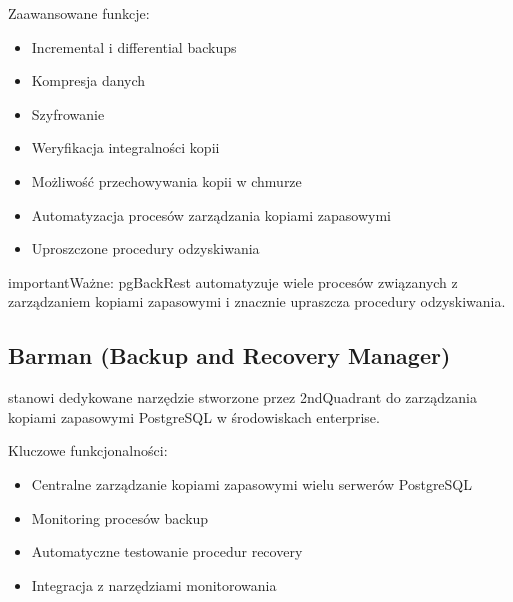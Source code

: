 \documentclass[letterpaper,10pt,polish]{sphinxmanual}
\begin{document}
\sphinxAtStartPar
Zaawansowane funkcje:
\begin{itemize}
\item {} 
\sphinxAtStartPar
Incremental i differential backups

\item {} 
\sphinxAtStartPar
Kompresja danych

\item {} 
\sphinxAtStartPar
Szyfrowanie

\item {} 
\sphinxAtStartPar
Weryfikacja integralności kopii

\item {} 
\sphinxAtStartPar
Możliwość przechowywania kopii w chmurze

\item {} 
\sphinxAtStartPar
Automatyzacja procesów zarządzania kopiami zapasowymi

\item {} 
\sphinxAtStartPar
Uproszczone procedury odzyskiwania

\end{itemize}

\begin{sphinxadmonition}{important}{Ważne:}
\sphinxAtStartPar
pgBackRest automatyzuje wiele procesów związanych z zarządzaniem kopiami zapasowymi i znacznie upraszcza procedury odzyskiwania.
\end{sphinxadmonition}


\subsection{Barman (Backup and Recovery Manager)}
\label{\detokenize{kopie_zapasowe_i_odzyskiwanie_danych:barman-backup-and-recovery-manager}}
\sphinxAtStartPar
{} stanowi dedykowane narzędzie stworzone przez 2ndQuadrant do zarządzania kopiami zapasowymi PostgreSQL w środowiskach enterprise.

\sphinxAtStartPar
Kluczowe funkcjonalności:
\begin{itemize}
\item {} 
\sphinxAtStartPar
Centralne zarządzanie kopiami zapasowymi wielu serwerów PostgreSQL

\item {} 
\sphinxAtStartPar
Monitoring procesów backup

\item {} 
\sphinxAtStartPar
Automatyczne testowanie procedur recovery

\item {} 
\sphinxAtStartPar
Integracja z narzędziami monitorowania

\end{itemize}
\end{document}
